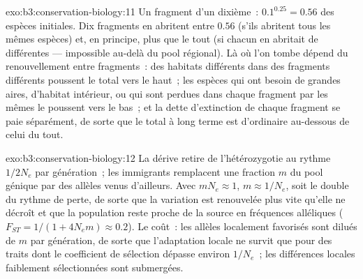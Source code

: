 \begin{solution}{exo:b3:conservation-biology:11}
Un fragment d'un dixième~: $0.1^{0.25} = 0.56$ des espèces initiales.
Dix fragments en abritent entre $0.56$ (s'ils abritent tous les mêmes
espèces) et, en principe, plus que le tout (si chacun en abritait de
différentes --- impossible au-delà du pool régional). Là où l'on tombe
dépend du renouvellement entre fragments~: des habitats différents dans
des fragments différents poussent le total vers le haut~; les espèces
qui ont besoin de grandes aires, d'habitat intérieur, ou qui sont
perdues dans chaque fragment par les mêmes  le poussent
vers le bas~; et la dette d'extinction de chaque fragment se paie
séparément, de sorte que le total à long terme est d'ordinaire
au-dessous de celui du tout.
\end{solution}

\begin{solution}{exo:b3:conservation-biology:12}
La dérive retire de l'hétérozygotie au rythme $1/2N_{e}$ par
génération~; les immigrants remplacent une fraction $m$ du pool génique
par des allèles venus d'ailleurs. Avec $mN_{e} \approx 1$,
$m \approx 1/N_{e}$, soit le double du rythme de perte, de sorte que la
variation est renouvelée plus vite qu'elle ne décroît et que la
population reste proche de la source en fréquences alléliques
($F_{ST} = 1/(1
+ 4N_{e}m) \approx 0.2$). Le coût~: les allèles localement favorisés
sont dilués de $m$ par génération, de sorte que l'adaptation locale ne
survit que pour des traits dont le coefficient de sélection dépasse
environ $1/N_{e}$~; les différences locales faiblement sélectionnées
sont submergées.
\end{solution}

